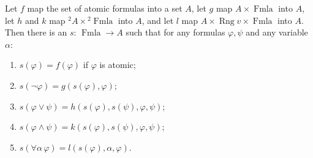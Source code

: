 Let $f$ map the set of atomic formulas into a set $A$, let $g$ map $A \times \operatorname{Fmla}$ into $A$, let $h$ and $k$ map ${}^2 A \times {}^2 \operatorname{Fmla}$ into $A$, and let $l$ map $A \times \operatorname{Rng} v \times \operatorname{Fmla}$ into $A$. Then there is an $s$: $\operatorname{Fmla} \to A$ such that for any formulas $\varphi, \psi$ and any variable $\alpha$:
\begin{enumerate}
\item[(i)] $s(\varphi) = f(\varphi)$ if $\varphi$ is atomic;
\item[(ii)] $s(\neg \varphi) = g(s(\varphi), \varphi)$;
\item[(iii)] $s(\varphi \vee \psi) = h(s(\varphi), s(\psi), \varphi, \psi)$;
\item[(iv)] $s(\varphi \wedge \psi) = k(s(\varphi), s(\psi), \varphi, \psi)$;
\item[(v)] $s(\forall \alpha \, \varphi) = l(s(\varphi), \alpha, \varphi)$.
\end{enumerate}
